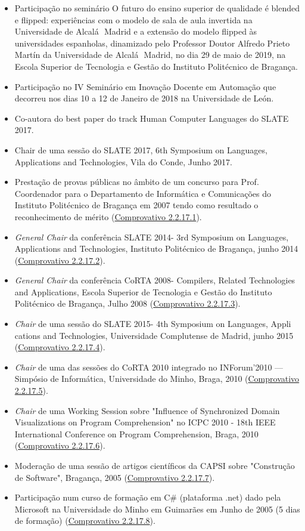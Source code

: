 \documentclass[11pt]{article}
\begin{document}
\begin{itemize}
\item {Participação no seminário O futuro do ensino superior de qualidade é blended e flipped: experiências com o modelo de sala de aula invertida na Universidade de Alcalá  Madrid e a extensão do modelo flipped às universidades espanholas, dinamizado pelo Professor Doutor Alfredo Prieto Martín da Universidade de Alcalá  Madrid, no dia 29 de maio de 2019, na Escola Superior de Tecnologia e Gestão do Instituto Politécnico de Bragança.}
\item {Participação no IV Seminário em Inovação Docente em Automação que decorreu nos dias 10 a 12 de Janeiro de 2018 na Universidade de León.}
\item {Co-autora do best paper do track Human Computer Languages do SLATE 2017.}
\item {Chair de uma sessão do SLATE 2017, 6th Symposium on Languages, Applications and Technologies, Vila do Conde, Junho 2017.}
\item {Prestação de provas públicas no âmbito de um concurso para Prof. Coordenador para o Departamento de Informática e Comunicações do Instituto Politécnico de Bragança em 2007 tendo como resultado o reconhecimento de mérito (\href{run:OutrasActCientif/provas.pdf}{Comprovativo 2.2.17.1}).}
\item {{\em{ General Chair}} da conferência SLATE 2014- 3rd Symposium on Languages, Applications and Technologies, Instituto Politécnico de Bragança, junho 2014 (\href{run:OutrasActCientif/GCslate2014.pdf}{Comprovativo 2.2.17.2}).}
\item {{\em{ General Chair}} da conferência CoRTA 2008- Compilers, Related Technologies and Applications, Escola Superior de Tecnologia e Gestão do Instituto Politécnico de Bragança, Julho 2008 (\href{run:OutrasActCientif/EDcorta08.pdf}{Comprovativo 2.2.17.3}).}
\item {{\em{ Chair}} de uma sessão do SLATE 2015- 4th Symposium on Languages, Appli cations and Technologies, Universidade Complutense de Madrid, junho 2015 (\href{run:OutrasActCientif/CHslate2015.pdf}{Comprovativo 2.2.17.4}).}
\item {{\em{ Chair}} de uma das sessões do CoRTA 2010 integrado no INForum'2010 --- Simpósio de Informática, Universidade do Minho, Braga, 2010 (\href{run:OutrasActCientif/CHCoRTA2010.pdf}{Comprovativo 2.2.17.5}).}
\item {{\em{ Chair}} de uma Working Session sobre "Influence of Synchronized Domain Visualizations on Program Comprehension" no ICPC 2010 - 18th IEEE International Conference on Program Comprehension, Braga, 2010 (\href{run:OutrasActCientif/WSicpc2010.pdf}{Comprovativo 2.2.17.6}).}
\item {Moderação de uma sessão de artigos científicos da CAPSI sobre "Construção de Software", Bragança, 2005 (\href{run:OutrasActCientif/ModeradorCapsi05.pdf}{Comprovativo 2.2.17.7}).}
\item {Participação num curso de formação em C\# (plataforma .net) dado pela Microsoft na Universidade do Minho em Guimarães em Junho de 2005 (5 dias de formação) (\href{run:OutrasActCientif/cursoGuimaraes.pdf}{Comprovativo 2.2.17.8}).}
\end{itemize} 
\end{document}
